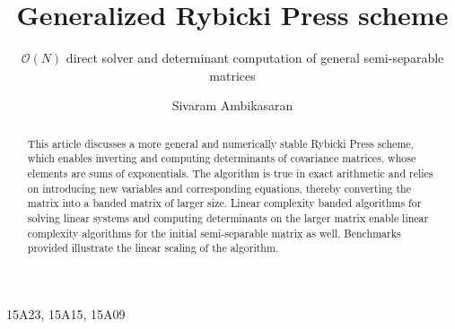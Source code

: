 \documentclass[final,leqno]{siamltex}
\title{Generalized Rybicki Press scheme}
\subtitle{$\mathcal{O}(N)$ direct solver and determinant computation of general semi-separable matrices}
\author{Sivaram Ambikasaran}
\begin{document}
\maketitle

\begin{abstract}
This article discusses a more general and numerically stable Rybicki Press scheme, which enables inverting and computing determinants of covariance matrices, whose elements are sums of exponentials. The algorithm is true in exact arithmetic and relies on introducing new variables and corresponding equations, thereby converting the matrix into a banded matrix of larger size. Linear complexity banded algorithms for solving linear systems and computing determinants on the larger matrix enable linear complexity algorithms for the initial semi-separable matrix as well. Benchmarks provided illustrate the linear scaling of the algorithm.
\end{abstract}

\begin{keywords}
\end{keywords}


\begin{AMS}
15A23, 15A15, 15A09
\end{AMS}

\pagestyle{myheadings}
\thispagestyle{plain}
\end{document}
